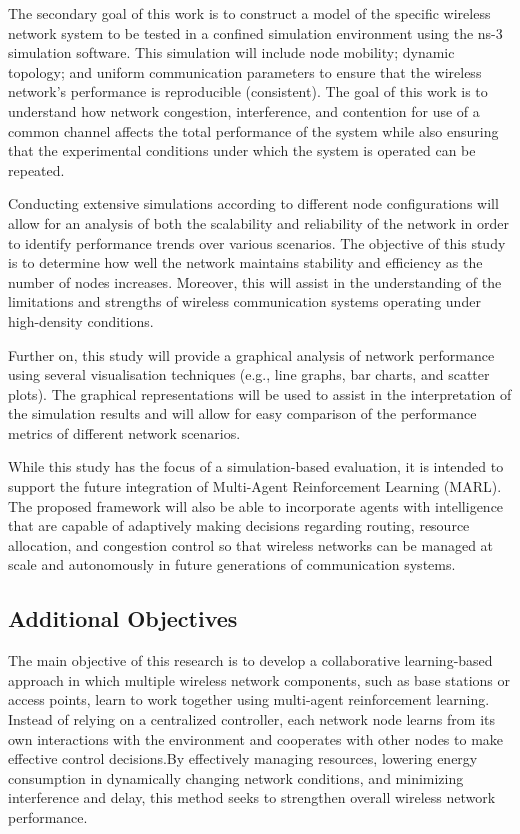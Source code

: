 \documentclass[a4paper,fleqn]{cas-dc}
\numberwithin{equation}{section}
\begin{document}
The secondary goal of this work is to construct a model of the specific wireless network system to be tested in a confined simulation environment using the ns-3 simulation software. This simulation will include node mobility; dynamic topology; and uniform communication parameters to ensure that the wireless network’s performance is reproducible (consistent). The goal of this work is to understand how network congestion, interference, and contention for use of a common channel affects the total performance of the system while also ensuring that the experimental conditions under which the system is operated can be repeated.

Conducting extensive simulations according to different node configurations will allow for an analysis of both the scalability and reliability of the network in order to identify performance trends over various scenarios. The objective of this study is to determine how well the network maintains stability and efficiency as the number of nodes increases. Moreover, this will assist in the understanding of the limitations and strengths of wireless communication systems operating under high-density conditions.

Further on, this study will provide a graphical analysis of network performance using several visualisation techniques (e.g., line graphs, bar charts, and scatter plots). The graphical representations will be used to assist in the interpretation of the simulation results and will allow for easy comparison of the performance metrics of different network scenarios.

While this study has the focus of a simulation-based evaluation, it is intended to support the future integration of Multi-Agent Reinforcement Learning (MARL). The proposed framework will also be able to incorporate agents with intelligence that are capable of adaptively making decisions regarding routing, resource allocation, and congestion control so that wireless networks can be managed at scale and autonomously in future generations of communication systems.



\subsection{Additional Objectives}

The main objective of this research is to develop a collaborative learning-based approach in which multiple wireless network components, such as base stations or access points, learn to work together using multi-agent reinforcement learning. Instead of relying on a centralized controller, each network node learns from its own interactions with the environment and cooperates with other nodes to make effective control decisions.By effectively managing resources, lowering energy consumption in dynamically changing network conditions, and minimizing interference and delay, this method seeks to strengthen overall wireless network performance.
\end{document}
